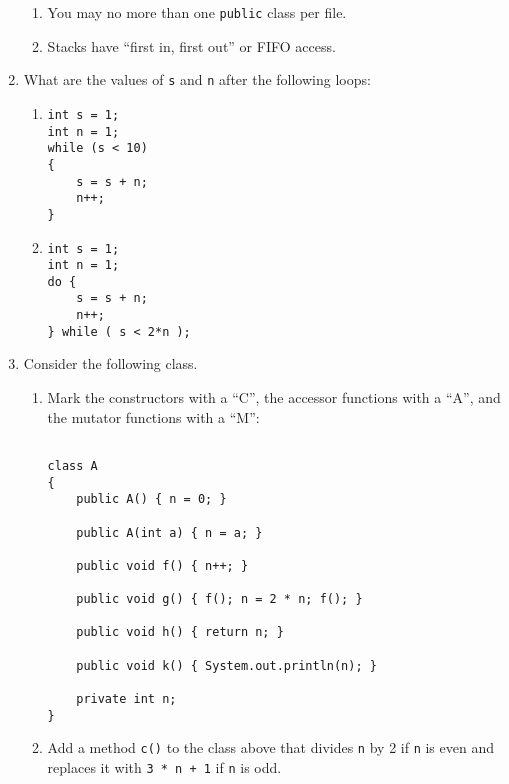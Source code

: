 \begin{enumerate}
\begin{enumerate}
	    \item \underline{\hspace{.25in}} You may no more than
		one {\tt public} class per file.

	    \item \underline{\hspace{.25in}} Stacks have 
		``first in, first out'' or FIFO access.


	\end{enumerate}

	\item What are the values of {\tt s} and {\tt n} after
	    the following loops:
	    \begin{enumerate}
		\item 
\begin{verbatim}
int s = 1;
int n = 1;
while (s < 10) 
{ 
    s = s + n; 
    n++; 
}
\end{verbatim}
		\item
\begin{verbatim}
int s = 1;
int n = 1;
do { 
    s = s + n; 
    n++; 
} while ( s < 2*n );
\end{verbatim}
	    \end{enumerate}

    \item Consider the following class.  
	\begin{enumerate}
	    \item Mark the constructors
		with a ``C'', the accessor functions with a ``A'',
		and the mutator functions with a ``M'':
\begin{verbatim}

class A
{
    public A() { n = 0; }

    public A(int a) { n = a; }

    public void f() { n++; }

    public void g() { f(); n = 2 * n; f(); }

    public void h() { return n; }

    public void k() { System.out.println(n); }

    private int n;
}

\end{verbatim}

	    \item  Add a method {\tt c()} to the class above that
		divides {\tt n} by 2 if {\tt n} is even and 
		replaces it with {\tt 3 * n + 1} if {\tt n} is odd.

	\end{enumerate}


\end{enumerate}
